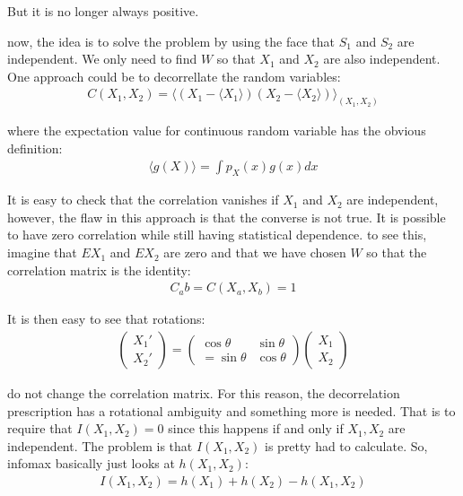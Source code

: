 \documentclass[11pt,a4paper,titlepage,dvipsnames,cmyk]{scrartcl}
\begin{document}
But it is no longer always positive.

now, the idea is to solve the problem by using the face that $S_1$ and $S_2$ are independent. We only need to find $W$ so that $X_1$ and $X_2$ are also independent. One approach could be to decorrellate the random variables:
\begin{align*}
C(X_1,X_2) = \langle (X_1 - \langle X_1\rangle)(X_2 - \langle X_2 \rangle ) \rangle _{(X_1,X_2)}
\end{align*}

where the expectation value for continuous random variable has the obvious definition:
\begin{align*}
\langle g(X) \rangle = \int p_X (x) g(x) dx
\end{align*}

It is easy to check that the correlation vanishes if $X_1$ and $X_2$ are independent, however, the flaw in this approach is that the converse is not true. It is possible to have zero correlation while still having statistical dependence.  to see this, imagine that $EX_1$ and $EX_2$ are zero and that we have chosen $W$ so that the correlation matrix is the identity:
\begin{align*}
C_ab = C(X_a, X_b) = 1
\end{align*}

It is then easy to see that rotations:
\begin{align*}
\begin{pmatrix}
    X_1' \\
    X_2'
\end{pmatrix}
= 
\begin{pmatrix}
    \cos \theta & \sin \theta \\
    =\sin \theta & \cos \theta
\end{pmatrix}
\begin{pmatrix}
    X_1 \\
    X_2
\end{pmatrix}
\end{align*}

do not change the correlation matrix. For this reason, the decorrelation prescription has a rotational ambiguity and something more is needed. That is to require that $I(X_1,X_2) = 0$ since this happens if and only if $X_1, X_2$ are independent. The problem is that $I(X_1,X_2)$ is pretty had to calculate. So, infomax basically just looks at $h(X_1,X_2)$:
\begin{align*}
I(X_1,X_2) = h(X_1) + h(X_2) - h(X_1, X_2)
\end{align*}
\end{document}
